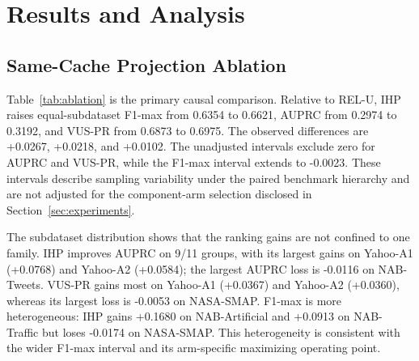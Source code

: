 \section{Results and Analysis}
\label{sec:results}

\subsection{Same-Cache Projection Ablation}

Table~\ref{tab:ablation} is the primary causal comparison. Relative to
\textsc{REL-U}, IHP raises equal-subdataset F1-max from 0.6354 to 0.6621,
AUPRC from 0.2974 to 0.3192, and VUS-PR from 0.6873 to 0.6975. The observed
differences are +0.0267, +0.0218, and +0.0102. The unadjusted intervals
exclude zero for AUPRC and VUS-PR, while the F1-max interval extends to
-0.0023. These intervals describe sampling variability under the paired
benchmark hierarchy and are not adjusted for the component-arm selection
disclosed in Section~\ref{sec:experiments}.

\begin{table}[t]
  \centering
  \caption{Same-cache projection ablation on 492 paired series. Intervals use
  10,000 hierarchical bootstrap replicates and are unadjusted for arm
  selection. ``Positive'' counts subdatasets with a positive IHP-minus-
  \textsc{REL-U} difference.}
  \label{tab:ablation}
  \footnotesize
\end{table}

The subdataset distribution shows that the ranking gains are not confined to
one family. IHP improves AUPRC on 9/11 groups, with its largest gains on
Yahoo-A1 (+0.0768) and Yahoo-A2 (+0.0584); the largest AUPRC loss is -0.0116
on NAB-Tweets. VUS-PR gains most on Yahoo-A1 (+0.0367) and Yahoo-A2
(+0.0360), whereas its largest loss is -0.0053 on NASA-SMAP. F1-max is more
heterogeneous: IHP gains +0.1680 on NAB-Artificial and +0.0913 on NAB-Traffic
but loses -0.0174 on NASA-SMAP. This heterogeneity is consistent with the
wider F1-max interval and its arm-specific maximizing operating point.


